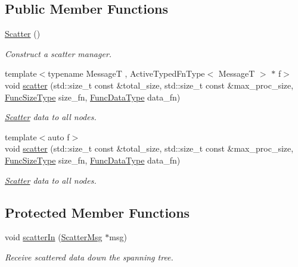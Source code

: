 \subsection*{Public Member Functions}
\begin{DoxyCompactItemize}
\item 
\hyperlink{structvt_1_1collective_1_1scatter_1_1_scatter_a33ea9a78c5d43dcea4ec2cb69d8b00b4}{Scatter} ()
\begin{DoxyCompactList}\small\item\em Construct a scatter manager. \end{DoxyCompactList}\item 
{\footnotesize template$<$typename MessageT , Active\+Typed\+Fn\+Type$<$ Message\+T $>$ $\ast$ f$>$ }\\void \hyperlink{structvt_1_1collective_1_1scatter_1_1_scatter_a0873f5fd4b890ad95e6ed6c097efe8bd}{scatter} (std\+::size\+\_\+t const \&total\+\_\+size, std\+::size\+\_\+t const \&max\+\_\+proc\+\_\+size, \hyperlink{structvt_1_1collective_1_1scatter_1_1_scatter_a977d895e42999a4078c6705ac851f447}{Func\+Size\+Type} size\+\_\+fn, \hyperlink{structvt_1_1collective_1_1scatter_1_1_scatter_a4040244e8ed36afd5d408c27efceea1b}{Func\+Data\+Type} data\+\_\+fn)
\begin{DoxyCompactList}\small\item\em \hyperlink{structvt_1_1collective_1_1scatter_1_1_scatter}{Scatter} data to all nodes. \end{DoxyCompactList}\item 
{\footnotesize template$<$auto f$>$ }\\void \hyperlink{structvt_1_1collective_1_1scatter_1_1_scatter_ab1993f3a5db651302eeca07d8aa739aa}{scatter} (std\+::size\+\_\+t const \&total\+\_\+size, std\+::size\+\_\+t const \&max\+\_\+proc\+\_\+size, \hyperlink{structvt_1_1collective_1_1scatter_1_1_scatter_a977d895e42999a4078c6705ac851f447}{Func\+Size\+Type} size\+\_\+fn, \hyperlink{structvt_1_1collective_1_1scatter_1_1_scatter_a4040244e8ed36afd5d408c27efceea1b}{Func\+Data\+Type} data\+\_\+fn)
\begin{DoxyCompactList}\small\item\em \hyperlink{structvt_1_1collective_1_1scatter_1_1_scatter}{Scatter} data to all nodes. \end{DoxyCompactList}\end{DoxyCompactItemize}
\subsection*{Protected Member Functions}
\begin{DoxyCompactItemize}
\item 
void \hyperlink{structvt_1_1collective_1_1scatter_1_1_scatter_aa80a957377cce3126058f3d7d30d2fed}{scatter\+In} (\hyperlink{structvt_1_1collective_1_1scatter_1_1_scatter_msg}{Scatter\+Msg} $\ast$msg)
\begin{DoxyCompactList}\small\item\em Receive scattered data down the spanning tree. \end{DoxyCompactList}\end{DoxyCompactItemize}
